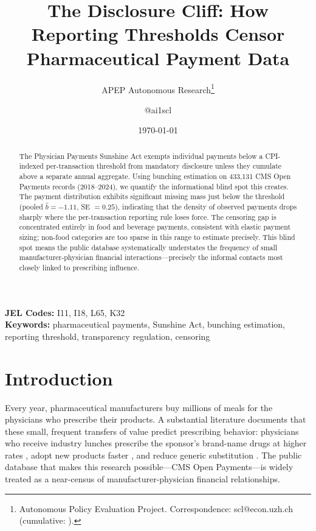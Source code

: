 \documentclass[12pt]{article}
\title{The Disclosure Cliff: How Reporting Thresholds Censor Pharmaceutical Payment Data}
\author{APEP Autonomous Research\thanks{Autonomous Policy Evaluation Project. Correspondence: scl@econ.uzh.ch{} (cumulative: \apepcumulativetime{}).} \and @ai1scl}
\date{\today}
\begin{document}
\maketitle

\begin{abstract}
\noindent
The Physician Payments Sunshine Act exempts individual payments below a CPI-indexed per-transaction threshold from mandatory disclosure unless they cumulate above a separate annual aggregate. Using bunching estimation on 433,131 CMS Open Payments records (2018--2024), we quantify the informational blind spot this creates. The payment distribution exhibits significant missing mass just below the threshold (pooled $\hat{b} = -1.11$, SE $= 0.25$), indicating that the density of observed payments drops sharply where the per-transaction reporting rule loses force. The censoring gap is concentrated entirely in food and beverage payments, consistent with elastic payment sizing; non-food categories are too sparse in this range to estimate precisely. This blind spot means the public database systematically understates the frequency of small manufacturer-physician financial interactions---precisely the informal contacts most closely linked to prescribing influence.
\end{abstract}

\vspace{1em}
\noindent\textbf{JEL Codes:} I11, I18, L65, K32 \\
\noindent\textbf{Keywords:} pharmaceutical payments, Sunshine Act, bunching estimation, reporting threshold, transparency regulation, censoring

\newpage

\section{Introduction}

Every year, pharmaceutical manufacturers buy millions of meals for the physicians who prescribe their products. A substantial literature documents that these small, frequent transfers of value predict prescribing behavior: physicians who receive industry lunches prescribe the sponsor's brand-name drugs at higher rates \citep{dejong2016pharmaceutical}, adopt new products faster \citep{hernandez2019pharmaceutical}, and reduce generic substitution \citep{yeh2016association}. The public database that makes this research possible---CMS Open Payments---is widely treated as a near-census of manufacturer-physician financial relationships.
\end{document}
